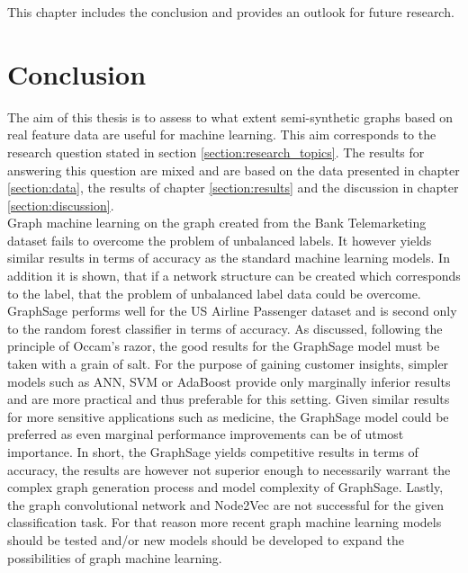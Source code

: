 
  This chapter includes the conclusion and provides an outlook for future
  research.

  \section{Conclusion}
  \label{section:conclusion}

  The aim of this thesis is to assess to what extent semi-synthetic graphs based 
  on real feature data are useful for machine learning. This aim corresponds to
  the research question stated in section \ref{section:research_topics}. The
  results for answering this question are mixed and are based on the data
  presented in chapter \ref{section:data}, the results of chapter
  \ref{section:results} and the discussion in chapter \ref{section:discussion}.
  \\

  \noindent Graph machine learning on the graph created from the Bank 
  Telemarketing dataset fails to overcome the problem of unbalanced labels. It 
  however yields similar results in terms of accuracy as the standard machine 
  learning models. In addition it is shown, that if a network structure can be 
  created which corresponds to the label, that the problem of unbalanced label 
  data could be overcome. \\

  \noindent GraphSage performs well for the US Airline Passenger dataset and
  is second only to the random forest classifier in terms of accuracy. As
  discussed, following the principle of Occam's razor, the good results for the
  GraphSage model must be taken with a grain of salt. For the purpose of
  gaining customer insights, simpler models such as ANN, SVM or AdaBoost provide
  only marginally inferior results and are more practical and thus preferable
  for this setting. Given similar results for more sensitive applications such
  as medicine, the GraphSage model could be preferred as even marginal
  performance improvements can be of utmost importance. In short, the GraphSage
  yields competitive results in terms of accuracy, the results are however not
  superior enough to necessarily warrant the complex graph generation process
  and model complexity of GraphSage. Lastly, the graph convolutional network and
  Node2Vec are not successful for the given classification task. For that
  reason more recent graph machine learning models should be tested and/or new 
  models should be developed to expand the possibilities of graph machine 
  learning.\\

